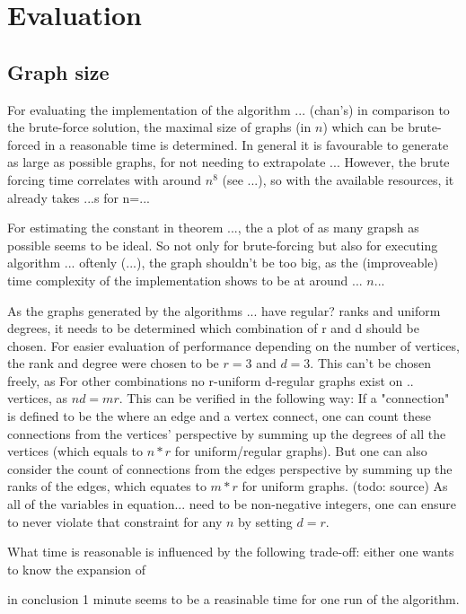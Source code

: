 \chapter{Evaluation}\label{chapter:Evaluation}

\section{Graph size}
For evaluating the implementation of the algorithm ... (chan's) in comparison to the brute-force solution, the maximal size of graphs (in $n$) which can be brute-forced in a reasonable time is determined. In general it is favourable to generate as large as possible graphs, for not needing to extrapolate ...
However, the brute forcing time correlates with around $n^8$ (see ...), so with the available resources, it already takes ...s for n=...

For estimating the constant in theorem ..., the a plot of as many grapsh as possible seems to be ideal. So not only for brute-forcing but also for executing algorithm ... oftenly (...), the graph shouldn't be too big, as the (improveable) time complexity of the implementation shows to be at around ... $n...$

As the graphs generated by the algorithms ... have regular? ranks and uniform degrees, it needs to be determined which combination of r and d should be chosen.
For easier evaluation of performance depending on the number of vertices, the rank and degree were chosen to be $r=3$ and $d=3$.
This can't be chosen freely, as For other combinations no r-uniform d-regular graphs exist on .. vertices, as $n d = m r$. This can be verified in the following way: If a "connection" is defined to be the where an edge and a vertex connect, one can count these connections from the vertices' perspective by summing up the degrees of all the vertices (which equals to $n*r$ for uniform/regular graphs). But one can also consider the count of connections from the edges perspective by summing up the ranks of the edges, which equates to $m*r$ for uniform graphs. (todo: source)
As all of the variables in equation... need to be non-negative integers, one can ensure to never violate that constraint for any $n$ by setting $d=r$. 



What time is reasonable is influenced by the following trade-off: either one wants to know the expansion of  

in conclusion 1 minute seems to be a reasinable time for one run of the algorithm.


